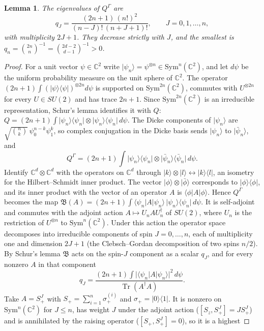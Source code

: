 \documentclass[11pt,a4paper]{article}
\newtheorem{lemma}[theorem]{Lemma}
\theoremstyle{definition}
\theoremstyle{plain}
\DeclareMathOperator{\Tr}{Tr}
\newcommand{\ket}[1]{\lvert#1\rangle}
\newcommand{\bra}[1]{\langle#1\rvert}
\newcommand{\ketbra}[2]{\lvert#1\rangle\langle#2\rvert}
\newcommand{\C}{\mathbb{C}}
\newcommand{\G}{\Gamma}
\begin{document}
\begin{lemma}\label{lem:QG}
The eigenvalues of $Q^\G$ are
\begin{equation}\label{eq:qJ}
q_J=\frac{(2n+1)\,(n!)^2}{(n-J)!\,(n+J+1)!},\qquad J=0,1,\dots,n,
\end{equation}
with multiplicity $2J+1$. They decrease strictly with $J$, and the smallest is
$q_n=\binom{2n}{n}^{-1}=\binom{2d-2}{d-1}^{-1}>0$.
\end{lemma}
\begin{proof}
For a unit vector $\psi\in\C^2$ write $\ket{\psi_n}=\psi^{\otimes n}\in
\mathrm{Sym}^n(\C^2)$, and let $d\psi$ be the uniform probability measure on
the unit sphere of $\C^2$. The operator
$(2n+1)\int(\ketbra\psi\psi)^{\otimes2n}d\psi$ is supported on
$\mathrm{Sym}^{2n}(\C^2)$, commutes with $U^{\otimes2n}$ for every
$U\in SU(2)$ and has trace $2n+1$. Since $\mathrm{Sym}^{2n}(\C^2)$ is an
irreducible representation, Schur's lemma identifies it with $Q$:
$Q=(2n+1)\int\ketbra{\psi_n}{\psi_n}\otimes\ketbra{\psi_n}{\psi_n}\,d\psi$. The
Dicke components of $\ket{\psi_n}$ are $\sqrt{\binom nk}\,\psi_0^{n-k}\psi_1^k$,
so complex conjugation in the Dicke basis sends $\ket{\psi_n}$ to
$\ket{\bar\psi_n}$, and
\[
Q^\G=(2n+1)\int\ketbra{\psi_n}{\psi_n}\otimes\ketbra{\bar\psi_n}{\bar\psi_n}\,d\psi .
\]
Identify $\C^d\otimes\C^d$ with the operators on $\C^d$ through
$\ket k\otimes\ket l\leftrightarrow\ketbra kl$, an isometry for the
Hilbert--Schmidt inner product. The vector $\ket\phi\otimes\ket{\bar\phi}$
corresponds to $\ketbra\phi\phi$, and its inner product with the vector of an
operator $A$ is $\bra\phi A\ket\phi$. Hence $Q^\G$ becomes the map
$\mathfrak B(A)=(2n+1)\int\bra{\psi_n}A\ket{\psi_n}\,\ketbra{\psi_n}{\psi_n}\,d\psi$.
It is self-adjoint and commutes with the adjoint action $A\mapsto U_nAU_n^\dagger$
of $SU(2)$, where $U_n$ is the restriction of $U^{\otimes n}$ to
$\mathrm{Sym}^n(\C^2)$. Under this action the operator space decomposes into
irreducible components of spin $J=0,\dots,n$, each of multiplicity one and
dimension $2J+1$ (the Clebsch--Gordan decomposition of two spins $n/2$). By
Schur's lemma $\mathfrak B$ acts on the spin-$J$ component as a scalar $q_J$,
and for every nonzero $A$ in that component
\[
q_J=\frac{(2n+1)\int\lvert\bra{\psi_n}A\ket{\psi_n}\rvert^2\,d\psi}{\Tr(A^\dagger A)} .
\]
Take $A=S_+^J$ with $S_+=\sum_{i=1}^n\sigma_+^{(i)}$ and
$\sigma_+=\ketbra01$. It is nonzero on $\mathrm{Sym}^n(\C^2)$ for $J\le n$,
has weight $J$ under the adjoint action ($[S_z,S_+^J]=JS_+^J$) and is
annihilated by the raising operator ($[S_+,S_+^J]=0$), so it is a highest

\end{proof}
\end{document}
